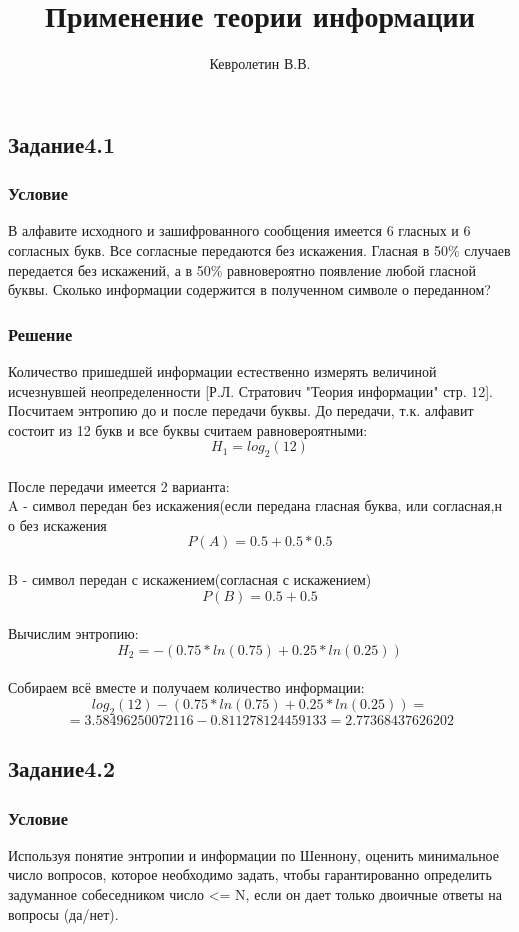 \documentclass[10pt,a4paper]{article}
\author{Кевролетин В.В.}
\title{Применение теории информации}
\begin{document}
\maketitle

\subsection*{Задание4.1}
\subsubsection*{Условие}
В алфавите исходного и зашифрованного сообщения имеется 6 гласных и 6
согласных букв. Все согласные передаются без искажения. Гласная в 50\%
случаев передается без искажений, а в 50\% равновероятно появление
любой гласной буквы. Сколько информации содержится в полученном
символе о переданном?
\subsubsection*{Решение}
Количество пришедшей информации естественно измерять величиной
исчезнувшей неопределенности [Р.Л. Стратович "Теория информации"
стр. 12].
Посчитаем энтропию до и после передачи буквы.
До передачи, т.к. алфавит состоит из 12 букв и все буквы считаем
равновероятными:
$$ H_1 = log_2(12) $$ \\
После передачи имеется 2 варианта: \\
A - символ передан без искажения(если передана гласная буква, или
согласная,н о без искажения \\
$$ P(A) = 0.5 + 0.5*0.5 $$ \\
B - символ передан с искажением(согласная с искажением)\\
$$ P(B) = 0.5 + 0.5 $$ \\
Вычислим энтропию:
$$ H_2 = - (0.75*ln(0.75) + 0.25*ln(0.25)) $$ \\
Собираем всё вместе и получаем количество информации: \\
$$ log_2(12) - (0.75*ln(0.75) + 0.25*ln(0.25)) = $$
$$ = 3.58496250072116 - 0.811278124459133 = 2.77368437626202 $$

\subsection*{Задание4.2}
\subsubsection*{Условие}
Используя понятие энтропии и информации по Шеннону, оценить
минимальное число вопросов, которое необходимо задать, чтобы
гарантированно определить задуманное собеседником число <= N, если
он дает только двоичные ответы на вопросы (да/нет).
\end{document}
